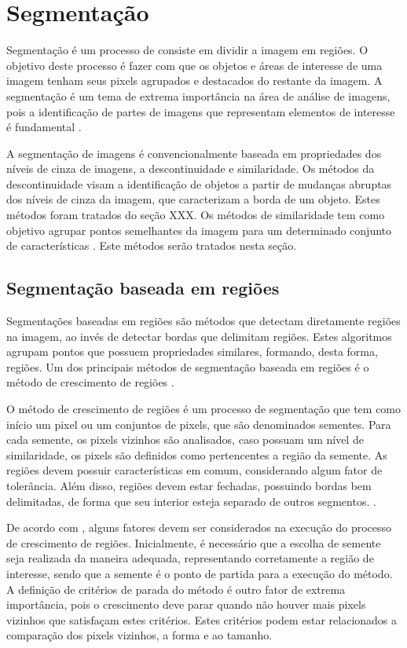 \documentclass[
	12pt,				%
	oneside,			%
	a4paper,			%
	english,			%
	french,				%
	spanish,			%
	brazil,				%
	]{abntex2}
\begin{document}
\section{Segmentação}  

Segmentação é um processo de consiste em dividir a imagem em regiões. O objetivo deste processo é fazer com que os objetos e áreas de interesse de uma imagem tenham seus pixels agrupados e destacados do restante da imagem. A segmentação é um tema de extrema importância na área de análise de imagens, pois a identificação de partes de imagens que representam elementos de interesse é fundamental \cite{conciAzevedoLeta:2008}.  

A segmentação de imagens é convencionalmente baseada em propriedades dos níveis de cinza de imagens, a descontinuidade e similaridade. Os métodos da descontinuidade visam a identificação de objetos a partir de mudanças abruptas dos níveis de cinza da imagem, que caracterizam a borda de um objeto. Estes métodos foram tratados do seção XXX. Os métodos de similaridade tem como objetivo agrupar pontos semelhantes da imagem para um determinado conjunto de características \cite{pedriniSchwartz:2008}. Este métodos serão tratados nesta seção.
    
\subsection{Segmentação baseada em regiões}     

Segmentações baseadas em regiões são métodos que detectam diretamente regiões na imagem, ao invés de detectar bordas que delimitam regiões. Estes algoritmos agrupam pontos que possuem propriedades similares, formando, desta forma, regiões. Um dos principais métodos de segmentação baseada em regiões é o método de crescimento de regiões \cite{pedriniSchwartz:2008}.

O método de crescimento de regiões é um processo de segmentação que tem como início um pixel ou um conjuntos de pixels, que são denominados sementes. Para cada semente, os pixels vizinhos são analisados, caso possuam um nível de similaridade, os pixels são definidos como pertencentes a região da semente. As regiões devem possuir características em comum, considerando algum fator de tolerância. Além disso, regiões devem estar fechadas, possuindo bordas bem delimitadas, de forma que seu interior esteja separado de outros segmentos. \cite{conciAzevedoLeta:2008}.

De acordo com \citet{conciAzevedoLeta:2008}, alguns fatores devem ser considerados na execução do processo de crescimento de regiões. Inicialmente, é necessário que a escolha de semente seja realizada da maneira adequada, representando corretamente a região de interesse, sendo que a semente é o ponto de partida para a execução do método. A definição de critérios de parada do método é outro fator de extrema importância, pois o crescimento deve parar quando não houver mais pixels vizinhos que satisfaçam estes critérios. Estes critérios podem estar relacionados a comparação dos pixels vizinhos, a forma e ao tamanho.
\end{document}
